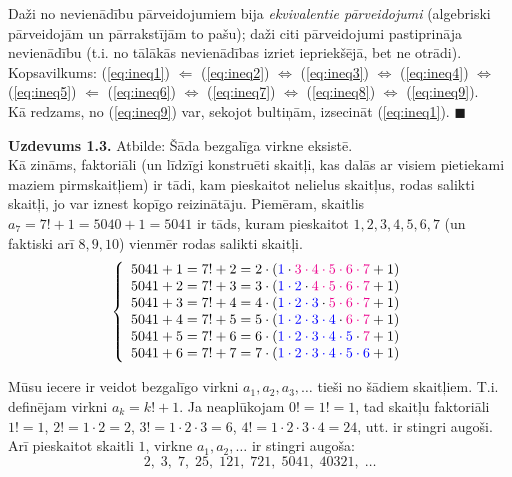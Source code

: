 \documentclass[a4paper,12pt]{article}
\begin{document}
Daži no nevienādību pārveidojumiem bija {\em ekvivalentie pārveidojumi} (algebriski pārveidojām un pārrakstījām to pašu); 
daži citi pārveidojumi pastiprināja nevienādību (t.i. no tālākās nevienādības izriet iepriekšējā, bet ne otrādi).\\
Kopsavilkums: (\ref{eq:ineq1}) $\Leftarrow$ (\ref{eq:ineq2}) $\Leftrightarrow$ (\ref{eq:ineq3}) $\Leftrightarrow$ (\ref{eq:ineq4}) 
$\Leftrightarrow$ (\ref{eq:ineq5}) $\Leftarrow$ (\ref{eq:ineq6}) $\Leftrightarrow$ (\ref{eq:ineq7}) $\Leftrightarrow$ (\ref{eq:ineq8}) 
$\Leftrightarrow$ (\ref{eq:ineq9}).\\
Kā redzams, no (\ref{eq:ineq9}) var, sekojot bultiņām, izsecināt (\ref{eq:ineq1}). $\blacksquare$







\newpage
{\bf Uzdevums 1.3.} Atbilde: Šāda bezgalīga virkne eksistē. \\
Kā zināms, faktoriāli (un līdzīgi konstruēti skaitļi, kas dalās ar visiem pietiekami maziem pirmskaitļiem) 
ir tādi, kam pieskaitot nelielus skaitļus, rodas salikti skaitļi, jo var iznest kopīgo reizinātāju. 
Piemēram, skaitlis $a_7 = 7! + 1 = 5040+1 = 5041$ ir tāds, kuram pieskaitot $1,2,3,4,5,6,7$ (un
faktiski arī $8,9,10$) vienmēr rodas salikti skaitļi. 
\begin{equation}
\left\{ \begin{array}{l}
\label{eq:prime-gaps}
5041+1 = 7!+2 = 2 \cdot (\textcolor{blue}{1} \cdot \textcolor{magenta}{3 \cdot 4 \cdot 5 \cdot 6 \cdot 7} + 1)\\
5041+2 = 7!+3 = 3 \cdot (\textcolor{blue}{1 \cdot 2} \cdot \textcolor{magenta}{4 \cdot 5 \cdot 6 \cdot 7} + 1)\\
5041+3 = 7!+4 = 4 \cdot (\textcolor{blue}{1 \cdot 2 \cdot 3} \cdot \textcolor{magenta}{5 \cdot 6 \cdot 7} + 1)\\
5041+4 = 7!+5 = 5 \cdot (\textcolor{blue}{1 \cdot 2 \cdot 3 \cdot 4} \cdot \textcolor{magenta}{6 \cdot 7} + 1)\\
5041+5 = 7!+6 = 6 \cdot (\textcolor{blue}{1 \cdot 2 \cdot 3 \cdot 4 \cdot 5} \cdot \textcolor{magenta}{7} + 1)\\
5041+6 = 7!+7 = 7 \cdot (\textcolor{blue}{1 \cdot 2 \cdot 3 \cdot 4 \cdot 5 \cdot 6} + 1)\\
\end{array} \right.
\end{equation}

Mūsu iecere ir veidot bezgalīgo virkni $a_1,a_2,a_3,\ldots$ tieši no šādiem skaitļiem. 
T.i. definējam virkni $a_k = k! + 1$. 
Ja neaplūkojam $0!=1! =1$, tad skaitļu faktoriāli $1!=1$, $2!=1 \cdot 2 = 2$, 
$3! = 1 \cdot 2 \cdot 3 = 6$, $4! = 1 \cdot 2 \cdot 3 \cdot 4 = 24$, utt. ir stingri augoši. Arī pieskaitot skaitli $1$, virkne
$a_1,a_2,\ldots$ ir stingri augoša: 
$$2,\;3,\;7,\;25,\;121,\;721,\;5041,\;40321,\;\ldots$$
\end{document}
